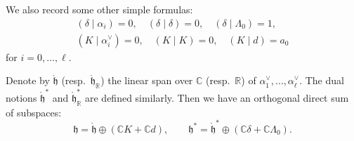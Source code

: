 \documentclass[12pt]{article}
\begin{document}
We also record some other simple formulas:
\begin{align*}
    (\delta \mid \alpha_i) = 0, \quad
    (\delta \mid \delta) = 0, \quad
    (\delta \mid \Lambda_0) = 1, \\
    (K \mid \alpha_i^\vee) = 0, \quad
    (K \mid K) = 0, \quad
    (K \mid d) = a_0
\end{align*} for $i=0,\dots,\ell$.

Denote by $\mathring{\mathfrak{h}}$ (resp.\ $\mathring{\mathfrak{h}}_{\mathbb{R}}$) the linear span over $\mathbb{C}$
(resp.\ $\mathbb{R}$) of $\alpha_1^\vee,\dots,\alpha_\ell^\vee$.
The dual notions $\mathring{\mathfrak{h}}^{*}$ and $\mathring{\mathfrak{h}}_{\mathbb{R}}^{*}$ are defined similarly.
Then we have an orthogonal direct sum of subspaces:
\[
    \mathfrak{h} = \mathring{\mathfrak{h}} \oplus (\mathbb{C}K + \mathbb{C}d),
    \qquad
    \mathfrak{h}^* = \mathring{\mathfrak{h}}^* \oplus (\mathbb{C}\delta + \mathbb{C}\Lambda_0).
\]
\end{document}
